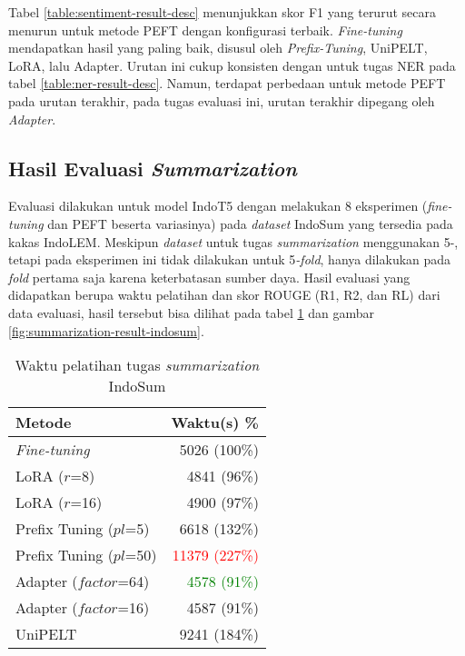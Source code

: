 Tabel \ref{table:sentiment-result-desc} menunjukkan skor F1 yang terurut secara menurun untuk metode PEFT dengan konfigurasi terbaik. \textit{Fine-tuning} mendapatkan hasil yang paling baik, disusul oleh \textit{Prefix-Tuning}, UniPELT, LoRA, lalu Adapter. Urutan ini cukup konsisten dengan untuk tugas NER pada tabel \ref{table:ner-result-desc}. Namun, terdapat perbedaan untuk metode PEFT pada urutan terakhir, pada tugas evaluasi ini, urutan terakhir dipegang oleh \textit{Adapter}.

\subsection{Hasil Evaluasi \textit{Summarization}}

Evaluasi dilakukan untuk model IndoT5 dengan melakukan 8 eksperimen (\textit{fine-tuning} dan PEFT beserta variasinya) pada \textit{dataset} IndoSum yang tersedia pada kakas IndoLEM. Meskipun \textit{dataset} untuk tugas \textit{summarization} menggunakan 5-, tetapi pada eksperimen ini tidak dilakukan untuk 5\textit{-fold}, hanya dilakukan pada \textit{fold} pertama saja karena keterbatasan sumber daya. Hasil evaluasi yang didapatkan berupa waktu pelatihan dan skor ROUGE (R1, R2, dan RL) dari data evaluasi, hasil tersebut bisa dilihat pada tabel \ref{table:runtime-summarization-indosum} dan gambar \ref{fig:summarization-result-indosum}.

\begin{table}[h]
    \centering
    \caption{Waktu pelatihan tugas \textit{summarization} IndoSum}
    \label{table:runtime-summarization-indosum}
    \begin{tabular}{l|r}
        \toprule
        \textbf{Metode} & \textbf{Waktu(s) \%} \\
        \midrule
        \textit{Fine-tuning} & 5026 (100\%) \\
        LoRA ($r$=8) & 4841 (96\%) \\
        LoRA ($r$=16) & 4900 (97\%) \\
        Prefix Tuning ($pl$=5) & 6618 (132\%) \\
        Prefix Tuning ($pl$=50) & \textcolor{Red}{11379 (227\%)} \\
        Adapter ($factor$=64) & \textcolor{Green}{4578 (91\%)} \\
        Adapter ($factor$=16) & 4587 (91\%) \\
        UniPELT & 9241 (184\%) \\
        \bottomrule
    \end{tabular}
\end{table}

